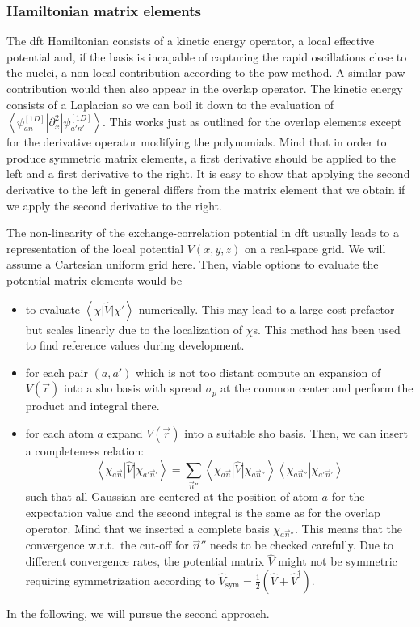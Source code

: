 \documentclass[oribibl]{llncs}
\newcommand{\um}[1]{_{\mathrm{#1}}}
\newcommand{\braket}[2]{\left\langle \left. #1 \right| #2 \right\rangle}
\newcommand{\braketop}[3]{\left\langle \left. #1 \right| #2 \left| #3 \right. \right\rangle}
\begin{document}
\subsubsection{Hamiltonian matrix elements}
The \ac{dft} Hamiltonian consists of a kinetic energy operator,
a local effective potential 
and, if the basis is incapable of
capturing the rapid oscillations close to the nuclei,
a non-local contribution according to the \ac{paw} method.
A similar \ac{paw} contribution would then also appear in the overlap operator.
The kinetic energy consists of a Laplacian so we can boil it down to the evaluation
of $\braketop{ \psi^{[1D]}_{an} }{ \partial^2_x }{ \psi^{[1D]}_{a'n'} }$.
This works just as outlined for the overlap elements
except for the derivative operator modifying the polynomials.
Mind that in order to produce symmetric matrix elements,
a first derivative should be applied to the left and a first derivative to the right.
It is easy to show that applying the second derivative to the left in general differs from
the matrix element that we obtain if we apply the second derivative to the right.

The non-linearity of the exchange-correlation potential in \ac{dft} usually
leads to a representation of the local potential $V(x,y,z)$ on a real-space grid.
We will assume a Cartesian uniform grid here.
Then, viable options to evaluate the potential matrix elements would be
\begin{itemize}
%
\item to evaluate $\braketop{ \chi }{ \hat V }{ \chi' }$ numerically. 
This may lead to a large cost prefactor but scales linearly due to the localization of $\chi$s.
This method has been used to find reference values during development.
%
\item for each pair $(a,a')$ which is not too distant
compute an expansion of $V(\vec r)$ into a \ac{sho} basis with spread $\sigma_p$
at the common center and perform the product and integral there.
%
\item for each atom $a$ expand $V(\vec r)$ into a suitable \ac{sho} basis. 
Then, we can insert a completeness relation: %
\begin{equation}
 \braketop{ \chi_{a\vec n} }{ \hat V }{ \chi_{a'\vec n'} } = \sum_{\vec n''}
 \braketop{ \chi_{a\vec n} }{ \hat V }{ \chi_{a\vec n''} } \braket{ \chi_{a\vec n''} }{ \chi_{a'\vec n'} }
\end{equation}
such that all Gaussian are centered at the position of atom $a$ for the expectation value
and the second integral is the same as for the overlap operator.
Mind that we inserted a complete basis $\chi_{a\vec n''}$. 
This means that the convergence w.r.t.~the cut-off for $\vec n''$ needs to be checked carefully.
Due to different convergence rates, the potential matrix $\hat V$ might not be symmetric
requiring symmetrization according to $\hat V\um{sym} = \frac 12 \left( \hat V + \hat V^\dagger \right)$.
%
\end{itemize}
In the following, we will pursue the second approach.
\end{document}
